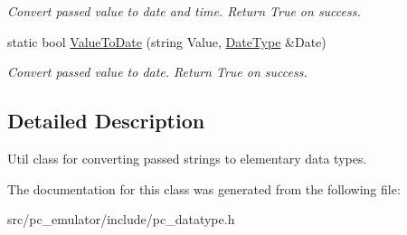 \begin{DoxyCompactItemize}
\begin{DoxyCompactList}\small\item\em Convert passed value to date and time. Return True on success. \end{DoxyCompactList}\item 
static bool \hyperlink{classpc__emulator_1_1DataTypeUtils_ad9dabf2772efc07427b69ac733dc3f33}{Value\+To\+Date} (string Value, \hyperlink{structpc__emulator_1_1DateDataType}{Date\+Type} \&Date)\hypertarget{classpc__emulator_1_1DataTypeUtils_ad9dabf2772efc07427b69ac733dc3f33}{}\label{classpc__emulator_1_1DataTypeUtils_ad9dabf2772efc07427b69ac733dc3f33}

\begin{DoxyCompactList}\small\item\em Convert passed value to date. Return True on success. \end{DoxyCompactList}\end{DoxyCompactItemize}


\subsection{Detailed Description}
Util class for converting passed strings to elementary data types. 

The documentation for this class was generated from the following file\+:\begin{DoxyCompactItemize}
\item 
src/pc\+\_\+emulator/include/pc\+\_\+datatype.\+h\end{DoxyCompactItemize}
